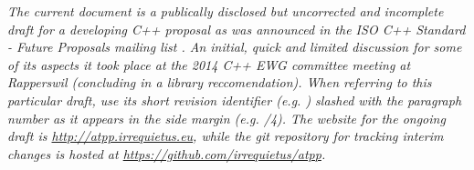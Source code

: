
\textit{{\color{tone1} The current document is a publically disclosed but uncorrected and incomplete draft for a developing C++ proposal as was announced in the ISO C++ Standard - Future Proposals mailing list \cite{Mak2014}.
{\textbf{\color{red}{It does not constitute a complete work yet, there may be errors.
None of the paragraphs are final yet.}}}
An initial, quick and limited discussion for some of its aspects it took place at the 2014 C++ EWG committee meeting at Rapperswil (concluding in a library reccomendation).
When referring to this particular draft, use its short revision identifier (e.g. {\color{magenta}{\GitShortRev{}}}) slashed with the paragraph number as it appears in the side margin (e.g. {\color{magenta}{\GitShortRev{}}/4}).
The website for the ongoing draft is \href{http://atpp.irrequietus.eu}{http://atpp.irrequietus.eu}, while the git repository for tracking interim changes is hosted at \textit{\href{https://github.com/irrequietus/atpp}{https://github.com/irrequietus/atpp}}.}}
